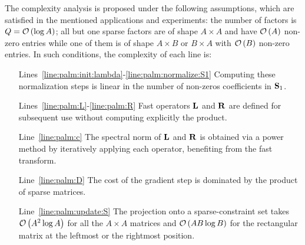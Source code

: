 The complexity analysis is proposed under the following assumptions, which are satisfied in the mentioned applications and experiments: the number of factors is $Q=\mathcal{O}\left (\log A\right )$; all but one sparse factors are of shape $A \times A$ and have $\mathcal{O}\left (A\right )$ non-zero entries while one of them is of shape $A\times B$ or $B\times A$ with $\mathcal{O}\left (B\right )$ non-zero entries.
In such conditions, the complexity of each line is:
\begin{itemize}
 \item [Lines~\ref{line:palm:init:lambda}-\ref{line:palm:normalize:S1}] Computing these normalization steps is linear in the number of non-zeros coefficients in ${\mathbf{S}}_1$.
 \item [Lines~\ref{line:palm:L}-\ref{line:palm:R}] Fast operators ${\mathbf{L}}$ and ${\mathbf{R}}$ are defined for subsequent use without computing explicitly the product.
 \item [Line~\ref{line:palm:c}] The spectral norm of ${\mathbf{L}}$ and ${\mathbf{R}}$ is obtained via a power method by iteratively applying each operator, benefiting from the fast transform.
 \item [Line~\ref{line:palm:D}] The cost of the gradient step is dominated by the product of sparse matrices.
\item [Line~\ref{line:palm:update:S}] The projection onto a sparse-constraint set takes $\mathcal{O}\left (A^2\log A\right )$ for all the $A\times A$ matrices and $\mathcal{O}\left (AB\log B\right )$ for the rectangular matrix at the leftmost or the rightmost position.

\end{itemize}
